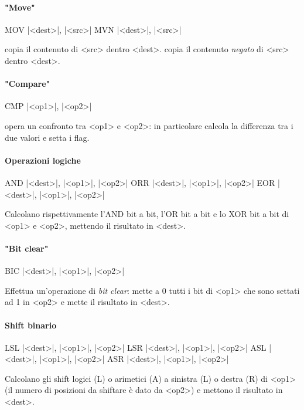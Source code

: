 \paragraph{"Move"}
\begin{ARMcode}
    MOV |<dest>|, |<src>|
    MVN |<dest>|, |<src>|
\end{ARMcode}
 copia il contenuto di <src> dentro <dest>.  copia il contenuto \emph{negato} di <src> dentro <dest>.

\paragraph{"Compare"}
\begin{ARMcode}
    CMP |<op1>|, |<op2>|
\end{ARMcode}
 opera un confronto tra <op1> e <op2>: in particolare calcola la differenza tra i due valori e setta i flag.

\paragraph{Operazioni logiche}
\begin{ARMcode}
    AND |<dest>|, |<op1>|, |<op2>|
    ORR |<dest>|, |<op1>|, |<op2>|
    EOR |<dest>|, |<op1>|, |<op2>|
\end{ARMcode}
Calcolano rispettivamente l'AND bit a bit, l'OR bit a bit e lo XOR bit a bit di <op1> e <op2>, mettendo il risultato in <dest>.

\paragraph{"Bit clear"}
\begin{ARMcode}
    BIC |<dest>|, |<op1>|, |<op2>|
\end{ARMcode}
Effettua un'operazione di \emph{bit clear}: mette a 0 tutti i bit di <op1> che sono settati ad 1 in <op2> e mette il risultato in <dest>.

\paragraph{Shift binario}
\begin{ARMcode}
    LSL |<dest>|, |<op1>|, |<op2>|
    LSR |<dest>|, |<op1>|, |<op2>|
    ASL |<dest>|, |<op1>|, |<op2>|
    ASR |<dest>|, |<op1>|, |<op2>|
\end{ARMcode}
Calcolano gli shift logici (L) o arimetici (A) a sinistra (L) o destra (R) di <op1> (il numero di posizioni da shiftare è dato da <op2>) e mettono il risultato in <dest>.


